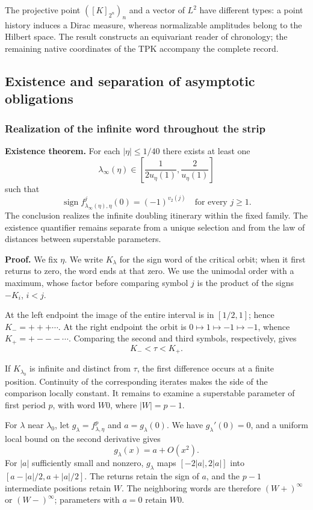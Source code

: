 The projective point \(([K]_{2^n})_n\) and a vector of \(L^2\) have different types: a point history induces a Dirac measure, whereas normalizable amplitudes belong to the Hilbert space. The result constructs an equivariant reader of chronology; the remaining native coordinates of the TPK accompany the complete record.


\subsection{Existence and separation of asymptotic obligations}
\label{hmtfg:prolongacion:6}

\subsubsection{Realization of the infinite word throughout the strip}
\label{hmtfg:prolongacion:6.1}

\textbf{Existence theorem.} For each \(|\eta|\le1/40\) there exists at least one
\[
\lambda_\infty(\eta)\in
\left[\frac1{2u_\eta(1)},\frac2{u_\eta(1)}\right]
\]
such that
\[
\boxed{\operatorname{sign}f_{\lambda_\infty(\eta),\eta}^{j}(0)
=(-1)^{v_2(j)}\quad\text{for every }j\ge1.}
\]
The conclusion realizes the infinite doubling itinerary within the fixed family. The existence quantifier remains separate from a unique selection and from the law of distances between superstable parameters.

\textbf{Proof.} We fix \(\eta\). We write \(K_\lambda\) for the sign word of the critical orbit; when it first returns to zero, the word ends at that zero. We use the unimodal order with a maximum, whose factor before comparing symbol \(j\) is the product of the signs \(-K_i\), \(i<j\).

At the left endpoint the image of the entire interval is in \([1/2,1]\); hence \(K_-=+++\cdots\). At the right endpoint the orbit is \(0\mapsto1\mapsto-1\mapsto-1\), whence \(K_+=+---\cdots\). Comparing the second and third symbols, respectively, gives
\[
K_-<\tau<K_+.
\]

If \(K_{\lambda_0}\) is infinite and distinct from \(\tau\), the first difference occurs at a finite position. Continuity of the corresponding iterates makes the side of the comparison locally constant. It remains to examine a superstable parameter of first period \(p\), with word \(W0\), where \(|W|=p-1\).

For \(\lambda\) near \(\lambda_0\), let \(g_\lambda=f_{\lambda,\eta}^p\) and \(a=g_\lambda(0)\). We have \(g_\lambda'(0)=0\), and a uniform local bound on the second derivative gives
\[
g_\lambda(x)=a+O(x^2).
\]
For \(|a|\) sufficiently small and nonzero, \(g_\lambda\) maps \([-2|a|,2|a|]\) into \([a-|a|/2,a+|a|/2]\). The returns retain the sign of \(a\), and the \(p-1\) intermediate positions retain \(W\). The neighboring words are therefore \((W+)^\infty\) or \((W-)^\infty\); parameters with \(a=0\) retain \(W0\).

